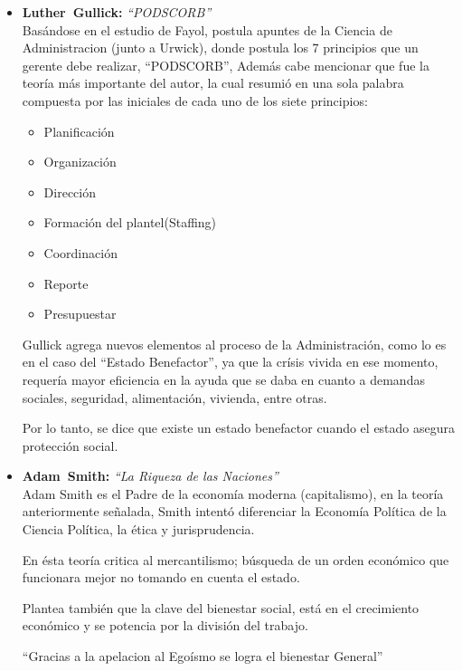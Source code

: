 
\begin{itemize}
	\item \textbf{Luther\ Gullick:} \emph{``PODSCORB''}\\
	Basándose en el estudio de Fayol,
	postula apuntes de la Ciencia de Administracion (junto a Urwick),
	donde postula los 7 principios que un gerente debe realizar,
	``PODSCORB'',
	Además cabe mencionar que fue la teoría más importante del autor,
	la cual resumió en una sola palabra compuesta por las iniciales de cada uno de los siete principios:
	\begin{itemize}
		\item Planificación
		\item Organización
		\item Dirección
		\item Formación del plantel(Staffing)
		\item Coordinación
		\item Reporte
		\item Presupuestar
	\end{itemize}
	Gullick agrega nuevos elementos al proceso de la Administración,
	como lo es en el caso del ``Estado Benefactor'',
	ya que la crísis vivida en ese momento,
	requería mayor eficiencia en la ayuda que se daba en cuanto a demandas sociales,
	seguridad, alimentación, vivienda, entre otras.
	
	Por lo tanto,
	se dice que existe un estado benefactor cuando el estado asegura protección social.

	\item \textbf{Adam\ Smith:} \emph{``La Riqueza de las Naciones''}\\
	Adam Smith es el Padre de la economía moderna (capitalismo),
	en la teoría anteriormente señalada,
	Smith intentó diferenciar la Economía Política de la Ciencia Política,
	la ética y jurisprudencia.
	
	En ésta teoría critica al mercantilismo;
	búsqueda de un orden económico que funcionara mejor no tomando en cuenta el estado.

	Plantea también que la clave del bienestar social,
	está en el crecimiento económico y se potencia por la división del trabajo.

	``Gracias a la apelacion al Egoísmo se logra el bienestar General''


\end{itemize}
